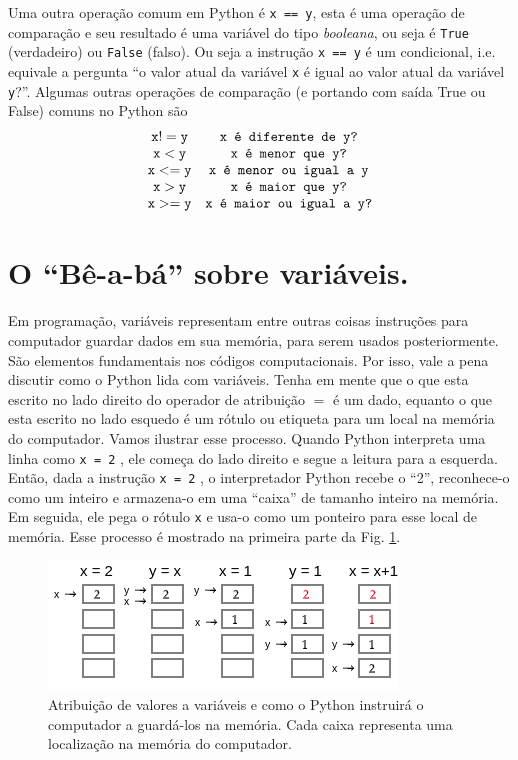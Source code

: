 Uma outra operação comum em Python é {\tt x == y}, esta é uma operação de comparação e seu resultado é uma variável do tipo {\it booleana}, ou seja é {\tt True} (verdadeiro) ou {\tt False} (falso). Ou seja a instrução {\tt x == y} é um condicional, i.e. equivale a pergunta ``o valor atual da variável {\tt x} é igual ao valor atual da variável {\tt y}?''. Algumas outras operações de comparação (e portando com saída True ou False) comuns no Python são
\[\begin{array}{cc}
{\tt x != y} & \text{\tt x é diferente de y?}\\
{\tt x < y} & \text{\tt x é menor que y?}\\
{\tt x <= y} & \text{\tt x é menor ou igual a y}\\
{\tt x > y} & \text{\tt x é maior que y?}\\
{\tt x >= y} & \text{\tt x é maior ou igual a y?}
\end{array}\]

\section{O ``Bê-a-bá'' sobre variáveis.}

Em programação, variáveis representam entre outras coisas instruções para computador guardar dados em sua memória, para serem usados posteriormente. São elementos fundamentais nos códigos computacionais. Por isso, vale a pena discutir como o Python lida com
variáveis. Tenha em mente que o que esta escrito no lado direito do operador de atribuição $=$ é um dado, equanto o que esta escrito no lado esquedo é um rótulo ou etiqueta para um local na memória do computador. Vamos ilustrar esse processo. Quando Python interpreta uma linha como {\tt x = 2} , ele começa do lado direito e segue a leitura para a esquerda. Então, dada a instrução {\tt x = 2} , o interpretador Python recebe o ``2'', reconhece-o como um inteiro e armazena-o em uma ``caixa'' de tamanho inteiro na memória. Em seguida, ele pega o rótulo {\tt x} e usa-o como um ponteiro para esse local de memória. Esse processo é mostrado na primeira parte da Fig. \ref{fig:memory}.
\begin{figure}[h]
\centering
\includegraphics[scale=0.7]{Images/memory.png}
\caption{Atribuição de valores a variáveis e como o Python instruirá o computador a guardá-los na memória. Cada caixa representa uma localização na memória do computador.}\label{fig:memory}
\end{figure}

